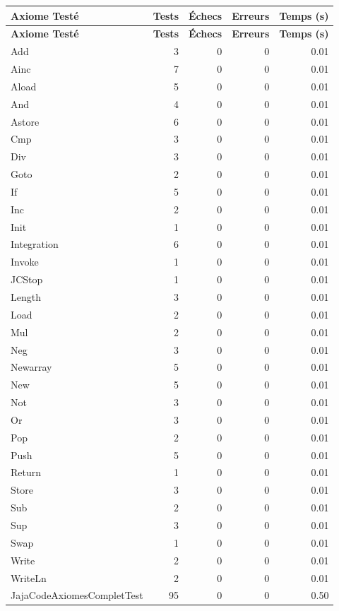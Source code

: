 \begin{center}
\small
\begin{longtable}{|l|r|r|r|r|}
\hline
\rowcolor{headerblue!20}
\textbf{Axiome Testé} & \textbf{Tests} & \textbf{Échecs} & \textbf{Erreurs} & \textbf{Temps (s)} \\
\hline
\endfirsthead
\hline
\rowcolor{headerblue!20}
\textbf{Axiome Testé} & \textbf{Tests} & \textbf{Échecs} & \textbf{Erreurs} & \textbf{Temps (s)} \\
\hline
\endhead
\hline
\endfoot
Add & 3 & 0 & 0 & 0.01 \\
\hline
Ainc & 7 & 0 & 0 & 0.01 \\
\hline
Aload & 5 & 0 & 0 & 0.01 \\
\hline
And & 4 & 0 & 0 & 0.01 \\
\hline
Astore & 6 & 0 & 0 & 0.01 \\
\hline
Cmp & 3 & 0 & 0 & 0.01 \\
\hline
Div & 3 & 0 & 0 & 0.01 \\
\hline
Goto & 2 & 0 & 0 & 0.01 \\
\hline
If & 5 & 0 & 0 & 0.01 \\
\hline
Inc & 2 & 0 & 0 & 0.01 \\
\hline
Init & 1 & 0 & 0 & 0.01 \\
\hline
Integration & 6 & 0 & 0 & 0.01 \\
\hline
Invoke & 1 & 0 & 0 & 0.01 \\
\hline
JCStop & 1 & 0 & 0 & 0.01 \\
\hline
Length & 3 & 0 & 0 & 0.01 \\
\hline
Load & 2 & 0 & 0 & 0.01 \\
\hline
Mul & 2 & 0 & 0 & 0.01 \\
\hline
Neg & 3 & 0 & 0 & 0.01 \\
\hline
Newarray & 5 & 0 & 0 & 0.01 \\
\hline
New & 5 & 0 & 0 & 0.01 \\
\hline
Not & 3 & 0 & 0 & 0.01 \\
\hline
Or & 3 & 0 & 0 & 0.01 \\
\hline
Pop & 2 & 0 & 0 & 0.01 \\
\hline
Push & 5 & 0 & 0 & 0.01 \\
\hline
Return & 1 & 0 & 0 & 0.01 \\
\hline
Store & 3 & 0 & 0 & 0.01 \\
\hline
Sub & 2 & 0 & 0 & 0.01 \\
\hline
Sup & 3 & 0 & 0 & 0.01 \\
\hline
Swap & 1 & 0 & 0 & 0.01 \\
\hline
Write & 2 & 0 & 0 & 0.01 \\
\hline
WriteLn & 2 & 0 & 0 & 0.01 \\
\hline
\rowcolor{successgreen!20}
JajaCodeAxiomesCompletTest & 95 & 0 & 0 & 0.50 \\
\hline
\end{longtable}
\end{center}

